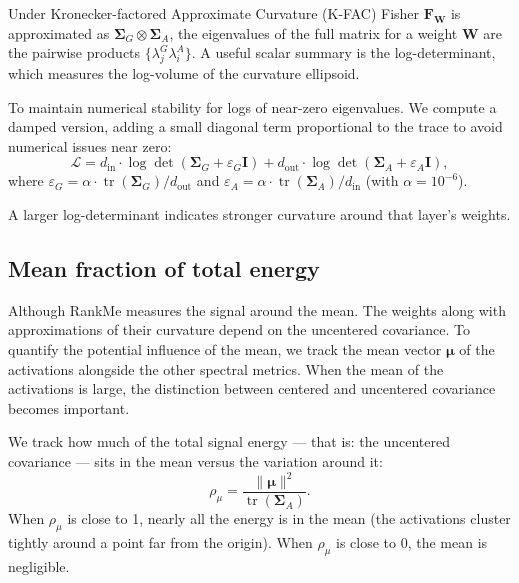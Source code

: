 \documentclass[11pt,a4paper]{article}
\newcommand{\tr}{\operatorname{tr}}
\newcommand{\kron}{\otimes}
\begin{document}
Under Kronecker-factored Approximate Curvature (K-FAC) Fisher $\mathbf{F}_{\mathbf{W}}$ is approximated as $\bm{\Sigma}_G \kron \bm{\Sigma}_A$, the eigenvalues of the full matrix for a weight $\mathbf{W}$ are the pairwise products $\{\lambda^G_j \lambda^A_i\}$.
A useful scalar summary is the log-determinant, which measures the log-volume of the curvature ellipsoid.

To maintain numerical stability for logs of near-zero eigenvalues. We compute a damped version, adding a small diagonal term proportional to the trace to avoid numerical issues near zero:
\begin{equation}
  \mathcal{L} = d_\text{in} \cdot \log\det(\bm{\Sigma}_G + \varepsilon_G \mathbf{I}) + d_\text{out} \cdot \log\det(\bm{\Sigma}_A + \varepsilon_A \mathbf{I}),
\end{equation}
where $\varepsilon_G = \alpha \cdot \tr(\bm{\Sigma}_G)/d_\text{out}$ and $\varepsilon_A = \alpha \cdot \tr(\bm{\Sigma}_A)/d_\text{in}$ (with $\alpha = 10^{-6}$).

A larger log-determinant indicates stronger curvature around that layer's weights.


\subsection{Mean fraction of total energy}

Although RankMe measures the signal around the mean. The weights along with approximations of their curvature depend on the uncentered covariance. To quantify the potential influence of the mean, we track the mean vector $\bm{\mu}$ of the activations alongside the other spectral metrics. When the mean of the activations is large, the distinction between centered and uncentered covariance becomes important.

We track how much of the total signal energy — that is: the uncentered covariance — sits in the mean versus the variation around it:
\begin{equation}
  \rho_\mu = \frac{\|\bm{\mu}\|^2}{\tr(\bm{\Sigma}_A)}.
\end{equation}
When $\rho_\mu$ is close to 1, nearly all the energy is in the mean (the activations cluster tightly around a point far from the origin).
When $\rho_\mu$ is close to 0, the mean is negligible.
\end{document}
